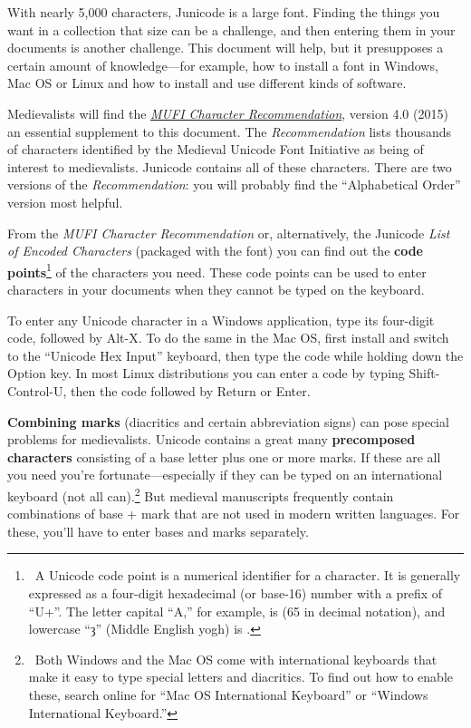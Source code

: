 With nearly 5,000 characters, Junicode is a large font. Finding the things you
want in a collection that size can be a challenge, and then entering them in your
documents is another challenge. This document will help, but it
presupposes a certain amount of knowledge—for example, how to install a font in
Windows, Mac OS or Linux and how to install and use different kinds of software.

Medievalists will find the \href{https://bora.uib.no/bora-xmlui/handle/1956/10699}%
{\textit{MUFI Character Recommendation}}, version 4.0 (2015)
an essential supplement to this document. The \textit{Recommendation} lists
thousands of characters identified by the
Medieval Unicode Font Initiative as being of interest to medievalists. Junicode
contains all of these characters. There are two versions of the \textit{Recommendation}:
you will probably find the “Alphabetical Order” version most helpful.

From the \textit{MUFI Character Recommendation} or, alternatively, the Junicode
\textit{List of Encoded Characters} (packaged with the font) you can find out
the \textbf{code points}\footnote{\ A Unicode code point is a numerical identifier for a character.
It is generally expressed as a
four-digit hexadecimal (or base-16) number with a prefix of ``U+''. The letter
capital ``A,'' for example, is  (65
in decimal notation), and lowercase ``ȝ'' (Middle English yogh) is .}
of the characters you need. These code points can be used to enter
characters in your documents when they cannot be typed on the keyboard.

To enter any Unicode character in a Windows application, type its four-digit
code, followed by Alt-X. To do the same in the Mac OS, first install and switch
to the “Unicode Hex Input” keyboard, then type the code while holding down the Option
key. In most Linux distributions you can enter a code by typing Shift-Control-U,
then the code followed by Return or Enter.

\textbf{Combining marks} (diacritics and certain abbreviation signs) can pose special problems for
medievalists. Unicode contains a great
many \textbf{precomposed characters} consisting of a base letter plus one or more marks.
If these are all you need you're fortunate---especially if they can be
typed on an international keyboard (not all can).\footnote{\ Both
Windows and the Mac OS come with international keyboards that make it easy to
type special letters and diacritics. To find out how to enable these, search
online for “Mac OS International Keyboard” or “Windows International Keyboard.”}
But medieval manuscripts frequently contain
combinations of base + mark that are not used in modern written languages.
For these, you'll have to
enter bases and marks separately.

